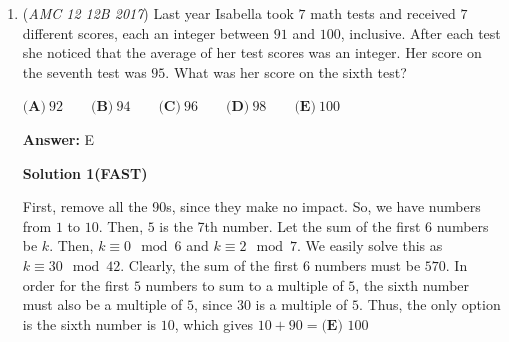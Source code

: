 \begin{enumerate}
 Solution by: vedadehhc\\ Edited by: jingwei325

 



\textbf{Solution 2(Similar to above solution)}

First, we'll ignore the restriction of the interval $(0, 1)$. Let $2^a \leq x < 2^b$ since this must be true for all real $x$. Then $\lfloor \log_2{x} \rfloor = a$. Therefore, for $\lfloor \log_2{y} \rfloor = a$ $y$ must belong in the same power of $2$ interval as $x$ namely $2^a \leq y < 2^b$. Since in this interval $1$ is the biggest real $2^b = 1 \implies b = 0$. Thus we're looking at intervals $(2^a, 1)$ starting from $a = -1, -2, \cdots$. Choosing two real numbers in the interval $(2^{-1}, 1) = (\frac{1}{2}, 1)$ has a length of $1 - \frac{1}{2} = \frac{1}{2}$ so the probability in this case $\frac{1}{2} \cdot \frac{1}{2} = \frac{1}{4}$. Similarly, for an interval from $(2^{-2}, 1) = (\frac{1}{4}, 1)$ but we've already covered the interval $(\frac{1}{2}, 1)$ so we only need to cover the interval $(\frac{1}{4}, \frac{1}{2})$ which has length $\frac{1}{2} - \frac{1}{4} = \frac{1}{4}$ therefore the probability is $\frac{1}{4} \cdot \frac{1}{4} = \frac{1}{16}$. We can go all the way to cover $(\frac{1}{4}, \frac{1}{8})$ and realize that this is just an infinite geometric sequence with initial term $\frac{1}{4}$ and common ratio $\frac{1}{4}$. So we have

 $\frac{\frac{1}{4}}{1 - \frac{1}{4}} = \frac{1}{3}$ so the answer is $(D)$.

 


	\item (\textit{AMC 12 12B 2017}) Last year Isabella took $7$ math tests and received $7$ different scores, each an integer between $91$ and $100$, inclusive. After each test she noticed that the average of her test scores was an integer. Her score on the seventh test was $95$. What was her score on the sixth test?


 $\textbf{(A)}\ 92\qquad\textbf{(B)}\ 94\qquad\textbf{(C)}\ 96\qquad\textbf{(D)}\ 98\qquad\textbf{(E)}\ 100$

 \textbf{Answer: }E



\textbf{Solution 1(FAST)}

First, remove all the 90s, since they make no impact. So, we have numbers from $1$ to $10$. Then, $5$ is the 7th number. Let the sum of the first $6$ numbers be $k$. Then, $k\equiv 0 \mod 6$ and $k\equiv 2 \mod 7$. We easily solve this as $k \equiv 30 \mod 42$. Clearly, the sum of the first $6$ numbers must be $570$. In order for the first $5$ numbers to sum to a multiple of $5$, the sixth number must also be a multiple of $5$, since $30$ is a multiple of $5$. Thus, the only option is the sixth number is $10$, which gives $10+90=  \boxed{\textbf{(E) }100}$





\end{enumerate}
